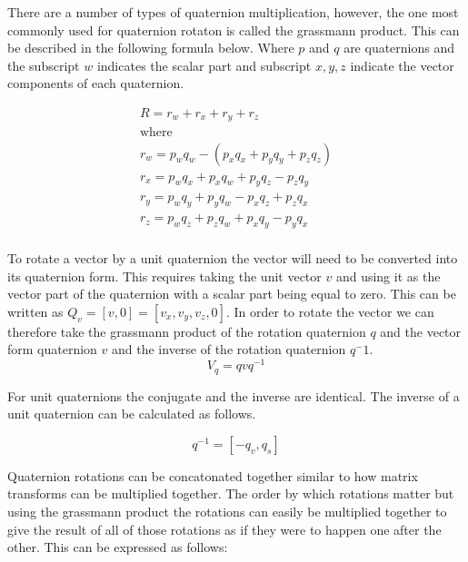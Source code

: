 There are a number of types of quaternion multiplication, however, the one most commonly used for quaternion rotaton is called the grassmann product. This can be described in the following formula below. Where $p$ and $q$ are quaternions and the subscript $w$ indicates the scalar part and subscript $x, y, z$ indicate the vector components of each quaternion.

\begin{equation}
\begin{aligned}
R = r_w + r_x + r_y + r_z\\
\text{where}\\
r_w = p_w q_w - (p_x q_x + p_y q_y + p_z q_z)\\
r_x = p_w q_x + p_x q_w + p_y q_z - p_z q_y\\
r_y = p_w q_y + p_y q_w - p_x q_z + p_z q_x\\
r_z = p_w q_z + p_z q_w + p_x q_y - p_y q_x\\
\end{aligned}
\end{equation}

To rotate a vector by a unit quaternion the vector will need to be converted into its quaternion form. This requires taking the unit vector $v$ and using it as the vector part of the quaternion with a scalar part being equal to zero. This can be written as $Q_v = [v, 0] = [v_x, v_y, v_z, 0]$. In order to rotate the vector we can therefore take the grassmann product of the rotation quaternion $q$ and the vector form quaternion $v$ and the inverse of the rotation quaternion $q^-1$. \\

\begin{equation}
	V_q = qvq^{-1}
\end{equation}

\noindent
For unit quaternions the conjugate and the inverse are identical. The inverse of a unit quaternion can be calculated as follows. 

\begin{equation}
	q^{-1} = [-q_v, q_s]
\end{equation}

\noindent
Quaternion rotations can be concatonated together similar to how matrix transforms can be multiplied together. The order by which rotations matter but using the grassmann product the rotations can easily be multiplied together to give the result of all of those rotations as if they were to happen one after the other. This can be expressed as follows:

